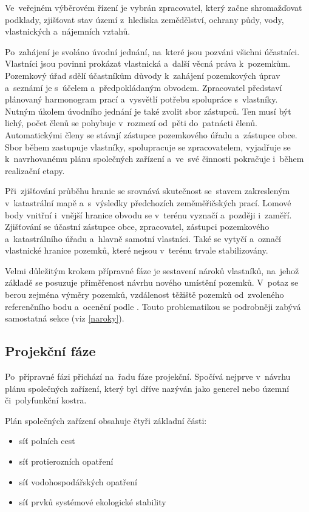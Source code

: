 Ve~veřejném výběrovém řízení je vybrán zpracovatel, který začne shromažďovat podklady, zjišťovat stav území z~hlediska zemědělství, ochrany půdy, vody, vlastnických a~nájemních vztahů.

Po~zahájení  je svoláno úvodní jednání, na~které jsou pozváni všichni účastníci. Vlastníci jsou povinni prokázat vlastnická a~další věcná práva k~pozemkům. Pozemkový úřad sdělí účastníkům důvody k~zahájení pozemkových úprav a~seznámí je s~účelem a~předpokládaným obvodem. Zpracovatel představí plánovaný harmonogram prací a~vysvětlí potřebu spolupráce s~vlastníky. Nutným úkolem úvodního jednání je také zvolit sbor zástupců. Ten musí být lichý, počet členů se pohybuje v~rozmezí od~pěti do~patnácti členů. Automatickými členy se stávají zástupce pozemkového úřadu a~zástupce obce. Sbor během  zastupuje vlastníky, spolupracuje se zpracovatelem, vyjadřuje se k~navrhovanému plánu společných zařízení a~ve~své činnosti pokračuje i~během realizační etapy.

Při~zjišťování průběhu hranic se srovnává skutečnost se~stavem zakresleným v~katastrální mapě a~s~výsledky předchozích zeměměřičských prací. Lomové body vnitřní i~vnější hranice obvodu se v~terénu vyznačí a~později i~zaměří. Zjišťování se účastní zástupce obce, zpracovatel, zástupci pozemkového a~katastrálního úřadu a~hlavně samotní vlastníci. Také se vytyčí a~označí vlastnické hranice pozemků, které nejsou v~terénu trvale stabilizovány.

Velmi důležitým krokem přípravné fáze je sestavení nároků vlastníků, na~jehož základě se posuzuje přiměřenost návrhu nového umístění pozemků. V~potaz se berou zejména výměry pozemků, vzdálenost těžiště pozemků od~zvoleného referenčního bodu a~ocenění podle . Touto problematikou se podrobněji zabývá samostatná sekce (viz \ref{naroky}).

\subsection{Projekční fáze}
\label{projekcni_faze}

Po~přípravné fázi přichází na~řadu fáze projekční. Spočívá nejprve v~návrhu plánu společných zařízení, který byl dříve nazýván jako generel nebo územní či~polyfunkční kostra.

Plán společných zařízení obsahuje čtyři základní části:
\vspace{-\topsep}
	\begin{itemize}[leftmargin=1.5cm, noitemsep]
		\item síť polních cest
		\item síť protierozních opatření
		\item síť vodohospodářských opatření
		\item síť prvků systémové ekologické stability
	\end{itemize}

